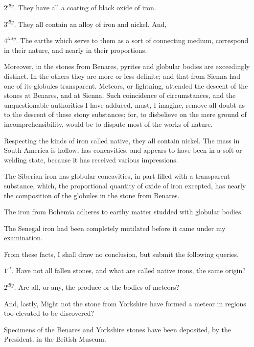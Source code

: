 \documentclass[a4paper, 12pt, oneside, twocolumn]{article}
\begin{document}
$2^{dly}$. They have all a coating of black oxide of iron.

$3^{dly}$. They all contain an alloy of iron and nickel. And,

$4^{thly}$. The earths which serve to them as a sort of connecting medium, correspond in their nature, and nearly in their proportions.

Moreover, in the stones from Benares, pyrites and globular bodies are exceedingly distinct. In the others they are more or less definite; and that from Sienna had one of its globules transparent. Meteors, or lightning, attended the descent of the stones at Benares, and at Sienna. Such coincidence of circumstances, and the unquestionable authorities I have adduced, must, I imagine, remove all doubt as to the descent of these stony substances; for, to disbelieve on the mere ground of incomprehensibility, would be to dispute most of the works of nature.

Respecting the kinds of iron called native, they all contain nickel. The mass in South America is hollow, has concavities, and appears to have been in a soft or welding state, because it has received various impressions.

The Siberian iron has globular concavities, in part filled with a transparent substance, which, the proportional quantity of oxide of iron excepted, has nearly the composition of the globules in the stone from Benares.

The iron from Bohemia adheres to earthy matter studded with globular bodies.

The Senegal iron had been completely mutilated before it came under my examination.

From these facts, I shall draw no conclusion, but submit the following queries.

$1^{st}$. Have not all fallen stones, and what are called native irons, the same origin?

$2^{dly}$. Are all, or any, the produce or the bodies of meteors?

And, lastly, Might not the stone from Yorkshire have formed a meteor in regions too elevated to be discovered?

Specimens of the Benares and Yorkshire stones have been deposited, by the President, in the British Museum.
\end{document}
